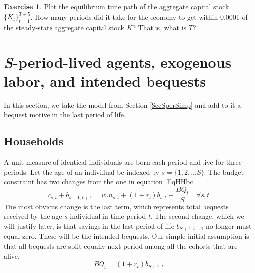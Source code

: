 \documentclass[letterpaper,12pt]{article}
\theoremstyle{definition}
\newtheorem{exercise}{Exercise} %
\numberwithin{equation}{section}
\numberwithin{exercise}{section}
\begin{document}
\begin{spacing}{1.5}
      \begin{exercise} \label{ExSperSimp_TPIplot}
         Plot the equilibrium time path of the aggregate capital stock $\{K_t\}_{t=1}^{T+5}$. How many periods did it take for the economy to get within 0.0001 of the steady-state aggregate capital stock $\bar{K}$? That is, what is $T$?
      \end{exercise}


\newpage
\section{\textit{S}-period-lived agents, exogenous labor, and intended bequests}\label{SecSperIntBeq}

   In this section, we take the model from Section \ref{SecSperSimp} and add to it a bequest motive in the last period of life.


   \subsection{Households}\label{SecSperIntBeqHH}

      A unit measure of identical individuals are born each period and live for three periods. Let the age of an individual be indexed by $s = \{1,2,...S\}$. The budget constraint has two changes from the one in equation \eqref{EqHHbc}.
      \begin{equation}\label{EqIntBeqHHbc}
         c_{s,t} + b_{s+1,t+1} = w_t n_{s,t} + (1 + r_{t})b_{s,t} + \frac{BQ_t}{S} \quad\forall s,t
      \end{equation}
      The most obvious change is the last term, which represents total bequests received by the age-$s$ individual in time period $t$. The second change, which we will justify later, is that savings in the last period of life $b_{S+1,t+1}$ no longer must equal zero. These will be the intended bequests. Our simple initial assumption is that all bequests are split equally next period among all the cohorts that are alive.
      \begin{equation}\label{EqIntBeqTotBeq}
         BQ_t = (1 + r_t)b_{S+1,t}
      \end{equation}


\end{spacing}
\end{document}
